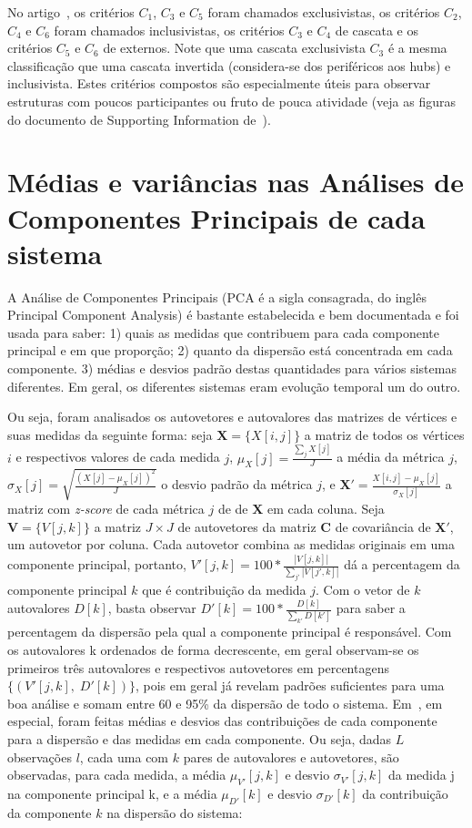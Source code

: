 \documentclass[a4paper,openright,12pt]{report} %
\begin{document}
No artigo~\cite{timeS}, os critérios $C_1$, $C_3$ e $C_5$ foram chamados exclusivistas,
os critérios $C_2$, $C_4$ e $C_6$ foram chamados inclusivistas,
os critérios $C_3$ e $C_4$ de cascata e os critérios $C_5$ e $C_6$ de externos. Note que uma cascata exclusivista $C_3$ é a mesma classificação que uma cascata invertida (considera-se dos periféricos aos hubs) e inclusivista. Estes critérios compostos são especialmente úteis para observar estruturas com poucos participantes ou fruto de pouca atividade (veja as figuras do documento de Supporting Information de~\cite{timeS}).

\section{Médias e variâncias nas Análises de Componentes Principais de cada sistema}\label{sec:pca}
A Análise de Componentes Principais (PCA é a sigla consagrada, do inglês Principal Component Analysis) é bastante estabelecida e bem documentada
e foi usada para saber: 
1) quais as medidas que contribuem para cada componente principal e em que proporção;
2) quanto da dispersão está concentrada em cada componente.
3) médias e desvios padrão destas quantidades para vários
sistemas diferentes. Em geral, os diferentes sistemas eram evolução
temporal um do outro.

Ou seja, foram analisados os autovetores e autovalores das matrizes
de vértices e suas medidas da seguinte forma: seja $\mathbf{X}=\{X[i,j]\}$
a matriz de todos os vértices $i$ e respectivos valores de cada medida $j$, 
$\mu_X [j]=\frac{\sum_j X[j]}{J}$ a média da métrica $j$, 
$\sigma_X [j]=\sqrt{\frac{(X[j]-\mu_X [j])^2}{J}}$ o desvio padrão da métrica $j$,
e $\mathbf{X'}={\frac{X[i,j]-\mu_X[j]}{\sigma_X[j]}}$ a matriz com \emph{z-score} de cada métrica $j$ de de $\mathbf{X}$ em cada coluna. 
Seja $\mathbf{V}=\{V[j,k]\}$ a matriz $J\times J$ de autovetores da matriz $\mathbf{C}$ de covariância
de $\mathbf{X'}$, um autovetor por coluna.
Cada autovetor combina as medidas originais em uma componente principal, portanto, $V'[j,k]=100*\frac{|V[j,k]|}{\sum_{j'} |V[j',k]|}$
dá a percentagem da componente principal $k$
que é contribuição da medida $j$.
Com o vetor de $k$ autovalores $D[k]$,
basta observar $D'[k]=100*\frac{D[k]}{\sum_{k'}D[k']}$ para saber
a percentagem da dispersão pela qual a componente principal é responsável.
Com os autovalores k ordenados de forma decrescente, 
em geral observam-se os primeiros três autovalores e respectivos
autovetores em percentagens $\{(V'[j,k],\;D'[k])\}$, pois em geral
já revelam padrões suficientes para uma boa análise e somam entre 60 e 95\% da dispersão de todo o sistema.
Em~\cite{timeS}, em especial, foram feitas médias e desvios das contribuições de cada componente para a dispersão e das medidas em cada componente. Ou seja, dadas $L$ observações $l$, cada uma com $k$ pares de autovalores e autovetores, são observadas, para cada medida,
a média $\mu_{V'}[j,k]$ e desvio $\sigma_{V'}[j,k]$ 
da medida j na componente principal k,
e a média $\mu_{D'}[k]$ e desvio $\sigma_{D'}[k]$ da 
contribuição da componente $k$ na dispersão do sistema:
\end{document}
